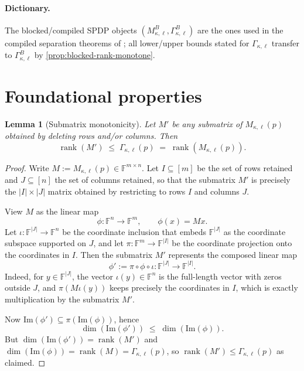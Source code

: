 \documentclass[12pt]{article}
\newtheorem{lemma}[theorem]{Lemma}
\theoremstyle{definition}
\theoremstyle{remark}
\begin{document}
\paragraph{Dictionary.}
The blocked/compiled SPDP objects $(M^B_{\kappa,\ell},\Gamma^B_{\kappa,\ell})$ are the ones
used in the compiled separation theorems of \citet{Edwards2025}; all lower/upper
bounds stated for $\Gamma_{\kappa,\ell}$ transfer to $\Gamma^B_{\kappa,\ell}$ by
\ref{prop:blocked-rank-monotone}.

\section{Foundational properties}
\label{sec:foundational-properties}

\begin{lemma}[Submatrix monotonicity]
\label{lem:submatrix-monotonicity}
Let $M'$ be any submatrix of $M_{\kappa,\ell}(p)$ obtained by deleting rows and/or
columns. Then
\[
\operatorname{rank}(M') \;\le\; \Gamma_{\kappa,\ell}(p) \;=\; \operatorname{rank}(M_{\kappa,\ell}(p)).
\]
\end{lemma}

\begin{proof}
Write $M := M_{\kappa,\ell}(p) \in \mathbb{F}^{m\times n}$. Let $I\subseteq[m]$ be the
set of rows retained and $J\subseteq[n]$ the set of columns retained, so that the
submatrix $M'$ is precisely the $|I|\times |J|$ matrix obtained by restricting to
rows $I$ and columns $J$.

View $M$ as the linear map
\[
\phi:\mathbb{F}^n \to \mathbb{F}^m,\qquad \phi(x)=Mx.
\]
Let $\iota:\mathbb{F}^{|J|}\to\mathbb{F}^n$ be the coordinate inclusion that embeds
$\mathbb{F}^{|J|}$ as the coordinate subspace supported on $J$, and let
$\pi:\mathbb{F}^m\to\mathbb{F}^{|I|}$ be the coordinate projection onto the
coordinates in $I$. Then the submatrix $M'$ represents the composed linear map
\[
\phi' := \pi \circ \phi \circ \iota:\mathbb{F}^{|J|}\to\mathbb{F}^{|I|}.
\]
Indeed, for $y\in\mathbb{F}^{|J|}$, the vector $\iota(y)\in\mathbb{F}^n$ is the
full-length vector with zeros outside $J$, and $\pi(M\iota(y))$ keeps precisely the
coordinates in $I$, which is exactly multiplication by the submatrix $M'$.

Now $\mathrm{Im}(\phi') \subseteq \pi(\mathrm{Im}(\phi))$, hence
\[
\dim(\mathrm{Im}(\phi')) \;\le\; \dim(\mathrm{Im}(\phi)).
\]
But $\dim(\mathrm{Im}(\phi'))=\operatorname{rank}(M')$ and
$\dim(\mathrm{Im}(\phi))=\operatorname{rank}(M)=\Gamma_{\kappa,\ell}(p)$, so
$\operatorname{rank}(M')\le \Gamma_{\kappa,\ell}(p)$ as claimed.
\end{proof}
\end{document}
